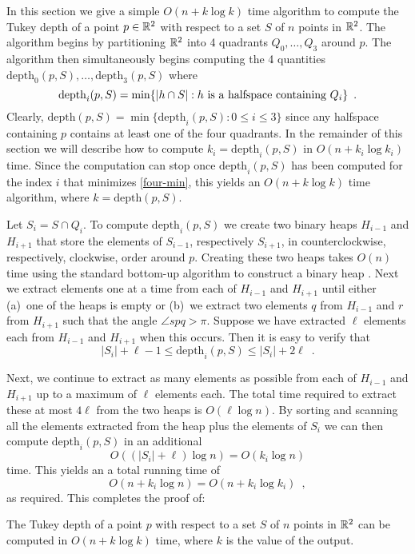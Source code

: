 \documentclass[charterfonts,lotsofwhite]{patmorin}
\newcommand{\td}{\mathrm{depth}}
\begin{document}
In this section we give a simple $O(n + k\log k)$ time algorithm to
compute the Tukey depth of a point $p\in\mathbb{R}^2$ with respect to
a set $S$ of $n$ points in $\mathbb{R}^2$.  The algorithm begins by
partitioning $\mathbb{R}^2$ into 4 quadrants $Q_0,\ldots,Q_3$ around $p$.
The algorithm then simultaneously begins computing the 4 quantities
$\td_0(p,S),\ldots,\td_3(p,S)$ where 
\begin{equation}
     \td_i(p,S) = \min\{|h\cap S| : \mbox{$h$ is a halfspace containing
$Q_i$} \} \enspace . \eqlabel{four-min}
\end{equation}
Clearly, $\td(p,S) = \min\{\td_i(p,S): 0\le i \le 3 \}$ since any
halfspace containing $p$ contains at least one of the four quadrants.
In the remainder of this section we will describe how to compute
$k_i=\td_i(p,S)$ in $O(n + k_i\log k_i)$ time.  Since the
computation can stop once $\td_i(p,S)$ has been computed for
the index $i$ that minimizes \eqref{four-min}, this yields an $O(n +
k\log k)$ time algorithm, where $k=\td(p,S)$.

Let $S_i=S\cap Q_i$. To compute $\td_i(p,S)$ we create two binary
heaps $H_{i-1}$ and $H_{i+1}$ that store the elements of $S_{i-1}$,
respectively $S_{i+1}$, in counterclockwise, respectively, clockwise,
order around $p$. Creating these two heaps takes $O(n)$ time using the
standard bottom-up algorithm to construct a binary heap \cite{clrXX}.
Next we extract elements one at a time from each of $H_{i-1}$ and
$H_{i+1}$ until either (a)~one of the heaps is empty or (b)~we extract
two elements $q$ from $H_{i-1}$ and $r$ from $H_{i+1}$ such that the
angle $\angle spq > \pi$.  Suppose we have extracted $\ell$ elements
each from $H_{i-1}$ and $H_{i+1}$ when this occurs.  Then it is easy
to verify that 
\[  
  |S_i| + \ell - 1 \le \td_i(p,S) \le |S_i| + 2\ell \enspace .
\]

Next, we continue to extract as many elements as possible from each of
$H_{i-1}$ and $H_{i+1}$ up to a maximum of $\ell$ elements each. The
total time required to extract these at most $4\ell$ from the two
heaps is $O(\ell\log n)$.  By sorting and scanning all the elements
extracted from the heap plus the elements of $S_i$ we can then
compute $\td_i(p,S)$ in an additional
\[
     O((|S_i|+\ell)\log n) = O(k_i\log n)
\] 
time.  This yields an a total running time of 
\[  
   O(n + k_i\log n) = O(n + k_i\log k_i) \enspace ,
\]
as required.  This completes the proof of:

\begin{thm}
The Tukey depth of a point $p$ with respect to a set $S$ of $n$ points
in $\mathbb{R}^2$ can be computed in $O(n + k\log k)$ time, where
$k$ is the value of the output.
\end{thm}
\end{document}

